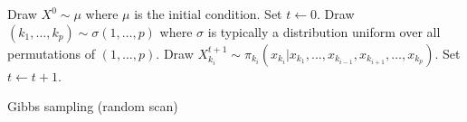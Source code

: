 \begin{algorithm}
\begin{algorithmic}
  \tophrule
  \STATE Draw $X^0\sim\mu$ where $\mu$ is the initial condition.
  \STATE Set $t\leftarrow0$.
  \REPEAT
    \STATE Draw $(k_1,\dots,k_p)\sim\sigma(1,\dots,p)$ where $\sigma$ is
    typically a distribution uniform over all permutations of $(1,\dots,p)$.
      \STATE Draw
      $X_{k_i}^{t+1}\sim
      \pi_{k_i}(x_{k_i}|x_{k_1},\dots,x_{k_{i-1}},x_{k_{i+1}},\dots,x_{k_p})$.
    \ENDFOR
    \STATE Set $t\leftarrow t+1$.
  \bottomhrule
\end{algorithmic}
\caption{Gibbs sampling (random scan)}
\label{alg:gibbs random}
\end{algorithm}
